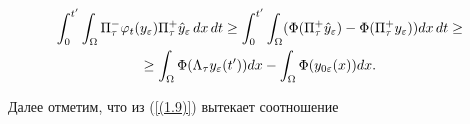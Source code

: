 \begin{gather}


\int^{t'}_{0} \int_{\Omega}


\Pi^{-}_{\tau} \varphi_t(y_\varepsilon) \Pi^{+}_{\tau}\Hat{y}_\varepsilon\, dx\, dt


\ge \int^{t'}_{0} \int_{\Omega}


( \Phi (\Pi^{+}_{\tau}\Hat{y}_\varepsilon)-


  \Phi (\Pi^{+}_{\tau}y_\varepsilon) ) dx\, dt \ge\notag\\


%












\ge \int_{\Omega} \Phi(\Lambda_\tau y_\varepsilon (t'))dx


- \int_{\Omega} \Phi (y_{0\varepsilon}(x)) dx. \label{04.2}


\end{gather}


Далее отметим, что из (\ref{(1.9)}) вытекает соотношение


